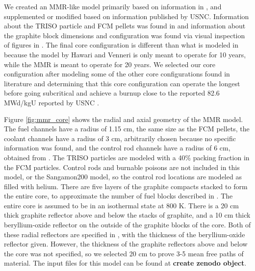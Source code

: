 We created an \gls{MMR}-like model primarily based on information in 
\cite{hawari_development_2018}, and supplemented or modified based on 
information published by \gls{USNC}. Information about the \gls{TRISO} 
particle and \gls{FCM} pellets was found in \cite{noauthor_usnc_2021}
and information about the graphite block dimensions and configuration 
was found via visual inspection of figures in \cite{venneri_micro_2019}. 
The final core configuration 
is different than what is modeled in \cite{hawari_development_2018} 
because the model by Hawari and Venneri is only meant to operate 
for 10 years, while the \gls{MMR} is meant to operate for 20 years. We 
selected our core configuration after modeling some of the other core 
configurations found in literature and determining that this core 
configuration can operate the longest before going subcritical and 
achieve a burnup close to the reported 82.6 MWd/kgU reported by 
\gls{USNC} \cite{noauthor_usnc_2021}. 

Figure \ref{fig:mmr_core} shows the radial and axial geometry of the 
\gls{MMR} model. The fuel channels have a radius of 1.15 cm, the same
size as the \gls{FCM} pellets, the coolant channels have a radius of 
3 cm, arbitrarily chosen because no specific information was found, 
and the control rod channels have a radius of 6 cm, obtained from 
\cite{hawari_development_2018}. The \gls{TRISO} particles are modeled 
with a 40\% packing fraction in the \gls{FCM} particles.
Control rods and burnable poisons are not included in this model, or 
the Sangamon200 model, so the control rod locations are modeled as 
filled with helium. There are five layers of the graphite compacts 
stacked to form the entire core, to approximate the number of 
fuel blocks described in \cite{noauthor_usnc_2021}. The entire core 
is assumed to be in an isothermal state at 800 K. There is a 20 cm 
thick graphite reflector above and below the stacks of graphite, 
and a 10 cm thick beryllium-oxide reflector on the outside of the 
graphite blocks of the core. Both of these radial reflectors are specified 
in \cite{hawari_development_2018}, with the thickness of the 
beryllium-oxide reflector given. However, the thickness of the graphite 
reflectors above and below the core was not specified, so we selected 
20 cm to prove 3-5 mean free paths of material. 
The input files for this model can be found at \textbf{create zenodo 
object}.

